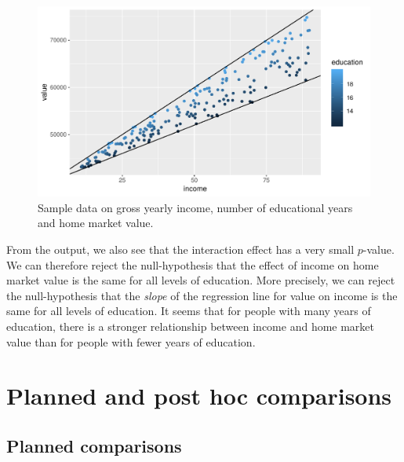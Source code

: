 \documentclass[]{book}\usepackage[]{graphicx}\usepackage[]{color}
\makeatletter
\def\maxwidth{ %
  \ifdim\Gin@nat@width>\linewidth
    \linewidth
  \else
    \Gin@nat@width
  \fi
}
\makeatother
\begin{document}
\begin{figure}

{\centering \includegraphics[width=\maxwidth]{figure/linearbylinear_2-1} 

}

\caption[Sample data on gross yearly income, number of educational years and home market value]{Sample data on gross yearly income, number of educational years and home market value.}\label{fig:linearbylinear_2}
\end{figure}



From the output, we also see that the interaction effect has a very small $p$-value. We can therefore reject the null-hypothesis that the effect of income on home market value is the same for all levels of education. More precisely, we can reject the null-hypothesis that the \textit{slope} of the regression line for value on income is the same for all levels of education. It seems that for people with many years of education, there is a stronger relationship between income and home market value than for people with fewer years of education. 



\chapter{Planned and post hoc comparisons}\label{chap:advanced}


\section{Planned comparisons}
\end{document}
